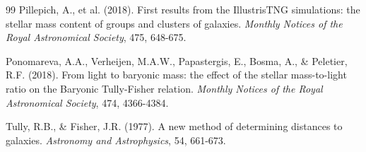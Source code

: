 \documentclass[12pt,a4paper]{article}
\begin{document}
\begin{thebibliography}{99}
Pillepich, A., et al. (2018). First results from the IllustrisTNG simulations: the stellar mass content of groups and clusters of galaxies. \textit{Monthly Notices of the Royal Astronomical Society}, 475, 648-675.

Ponomareva, A.A., Verheijen, M.A.W., Papastergis, E., Bosma, A., \& Peletier, R.F. (2018). From light to baryonic mass: the effect of the stellar mass-to-light ratio on the Baryonic Tully-Fisher relation. \textit{Monthly Notices of the Royal Astronomical Society}, 474, 4366-4384.

Tully, R.B., \& Fisher, J.R. (1977). A new method of determining distances to galaxies. \textit{Astronomy and Astrophysics}, 54, 661-673.

\end{thebibliography}
\end{document}
